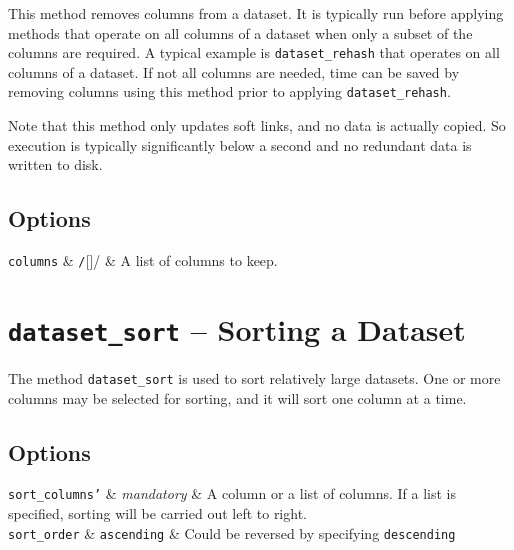 This method removes columns from a dataset.  It is typically run
before applying methods that operate on all columns of a dataset when
only a subset of the columns are required.  A typical example is
\texttt{dataset\_rehash} that operates on all columns of a dataset.
If not all columns are needed, time can be saved by removing columns
using this method prior to applying \texttt{dataset\_rehash}.

Note that this method only updates soft links, and no data is actually
copied.  So execution is typically significantly below a second and no
redundant data is written to disk.

\subsection*{Options}
\starttable
  \RP \texttt{columns} & \texttt/[]/ & A list of columns to
  keep.\\[1ex]
\stoptable





\clearpage
\section{\texttt{dataset\_sort} -- Sorting a Dataset}
The method \texttt{dataset\_sort} is used to sort relatively large
datasets.  One or more columns may be selected for sorting, and it
will sort one column at a time.

\subsection*{Options}

\starttable
\RP \texttt{sort\_columns'} & \textsl{mandatory} & A column or a list of
  columns.  If a list is specified, sorting will be carried out left
  to right.\\[1ex]

  \RP \texttt{sort\_order} & \texttt{ascending} & Could be reversed by
  specifying \texttt{descending}\\[1ex]
  
